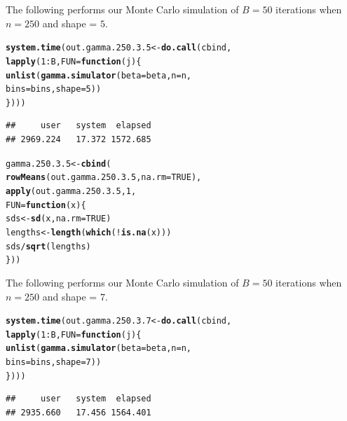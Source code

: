 \documentclass[11pt]{article}\usepackage[]{graphicx}\usepackage[]{color}
\makeatletter
\newcommand{\hlnum}[1]{\textcolor[rgb]{0.686,0.059,0.569}{#1}}%
\newcommand{\hlopt}[1]{\textcolor[rgb]{0,0,0}{#1}}%
\newcommand{\hlstd}[1]{\textcolor[rgb]{0.345,0.345,0.345}{#1}}%
\newcommand{\hlkwa}[1]{\textcolor[rgb]{0.161,0.373,0.58}{\textbf{#1}}}%
\newcommand{\hlkwb}[1]{\textcolor[rgb]{0.69,0.353,0.396}{#1}}%
\newcommand{\hlkwc}[1]{\textcolor[rgb]{0.333,0.667,0.333}{#1}}%
\newcommand{\hlkwd}[1]{\textcolor[rgb]{0.737,0.353,0.396}{\textbf{#1}}}%
\newenvironment{kframe}{%
 \def\at@end@of@kframe{}%
 \ifinner\ifhmode%
  \def\at@end@of@kframe{\end{minipage}}%
  \begin{minipage}{\columnwidth}%
 \fi\fi%
 \def\FrameCommand##1{\hskip\@totalleftmargin \hskip-\fboxsep
 \colorbox{shadecolor}{##1}\hskip-\fboxsep
     \hskip-\linewidth \hskip-\@totalleftmargin \hskip\columnwidth}%
 \MakeFramed {\advance\hsize-\width
   \@totalleftmargin\z@ \linewidth\hsize
   \@setminipage}}%
 {\par\unskip\endMakeFramed%
 \at@end@of@kframe}
\newenvironment{knitrout}{}{} %
\makeatother
\begin{document}
The following performs our Monte Carlo simulation of $B = 50$ iterations 
when $n = 250$ and shape = $5$.

\begin{knitrout}
\color{fgcolor}\begin{kframe}
\begin{alltt}
\hlkwd{system.time}\hlstd{(out.gamma.250.3.5} \hlkwb{<-} \hlkwd{do.call}\hlstd{(cbind,}
  \hlkwd{lapply}\hlstd{(}\hlnum{1}\hlopt{:}\hlstd{B,} \hlkwc{FUN} \hlstd{=} \hlkwa{function}\hlstd{(}\hlkwc{j}\hlstd{)\{}
    \hlkwd{unlist}\hlstd{(}\hlkwd{gamma.simulator}\hlstd{(}\hlkwc{beta} \hlstd{= beta,} \hlkwc{n} \hlstd{= n,}
      \hlkwc{bins} \hlstd{= bins,} \hlkwc{shape} \hlstd{=} \hlnum{5}\hlstd{))}
\hlstd{\})))}
\end{alltt}
\begin{verbatim}
##     user   system  elapsed 
## 2969.224   17.372 1572.685
\end{verbatim}
\end{kframe}
\end{knitrout}

\begin{knitrout}
\color{fgcolor}\begin{kframe}
\begin{alltt}
\hlstd{gamma.250.3.5} \hlkwb{<-} \hlkwd{cbind}\hlstd{(}
  \hlkwd{rowMeans}\hlstd{(out.gamma.250.3.5,} \hlkwc{na.rm} \hlstd{=} \hlnum{TRUE}\hlstd{),}
  \hlkwd{apply}\hlstd{(out.gamma.250.3.5,} \hlnum{1}\hlstd{,}
  \hlkwc{FUN} \hlstd{=} \hlkwa{function}\hlstd{(}\hlkwc{x}\hlstd{)\{}
    \hlstd{sds} \hlkwb{<-} \hlkwd{sd}\hlstd{(x,} \hlkwc{na.rm} \hlstd{=} \hlnum{TRUE}\hlstd{)}
    \hlstd{lengths} \hlkwb{<-} \hlkwd{length}\hlstd{(}\hlkwd{which}\hlstd{(}\hlopt{!}\hlkwd{is.na}\hlstd{(x)))}
    \hlstd{sds} \hlopt{/} \hlkwd{sqrt}\hlstd{(lengths)}
  \hlstd{\}))}
\end{alltt}
\end{kframe}
\end{knitrout}

The following performs our Monte Carlo simulation of $B = 50$ iterations 
when $n = 250$ and shape = $7$.

\begin{knitrout}
\color{fgcolor}\begin{kframe}
\begin{alltt}
\hlkwd{system.time}\hlstd{(out.gamma.250.3.7} \hlkwb{<-} \hlkwd{do.call}\hlstd{(cbind,}
  \hlkwd{lapply}\hlstd{(}\hlnum{1}\hlopt{:}\hlstd{B,} \hlkwc{FUN} \hlstd{=} \hlkwa{function}\hlstd{(}\hlkwc{j}\hlstd{)\{}
    \hlkwd{unlist}\hlstd{(}\hlkwd{gamma.simulator}\hlstd{(}\hlkwc{beta} \hlstd{= beta,} \hlkwc{n} \hlstd{= n,}
      \hlkwc{bins} \hlstd{= bins,} \hlkwc{shape} \hlstd{=} \hlnum{7}\hlstd{))}
\hlstd{\})))}
\end{alltt}
\begin{verbatim}
##     user   system  elapsed 
## 2935.660   17.456 1564.401
\end{verbatim}
\end{kframe}
\end{knitrout}
\end{document}
